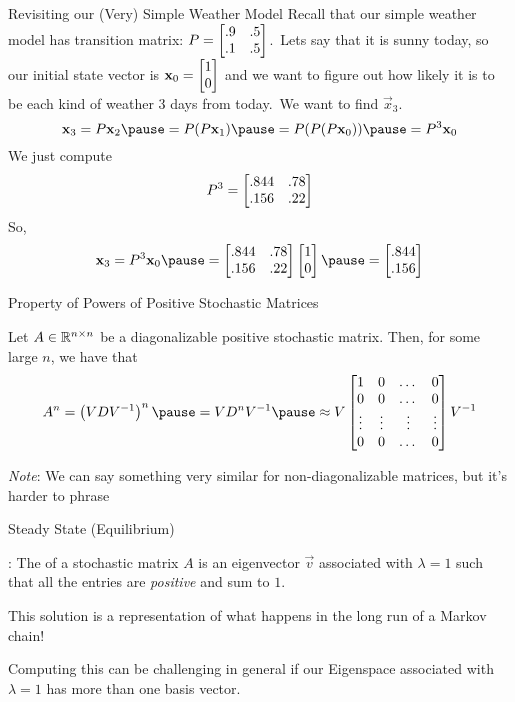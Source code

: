 \documentclass[xcoler=dvipsnames, aspectratio=169]{beamer}
\begin{document}
    \begin{frame}{Revisiting our (Very) Simple Weather Model}
        Recall that our simple weather model has transition matrix: $P=\begin{bmatrix}.9 & .5\\.1 & .5\end{bmatrix}$.\pause\
        Lets say that it is sunny today, so our initial state vector is $\mathbf{x}_0 = \begin{bmatrix}1\\0\end{bmatrix}$
        and we want to figure out how likely it is to be each kind of weather $3$ days from today.\pause\
        We want to find $\vec{x}_3$.\pause
        \[
            \vec{x}_3 = P\vec{x}_2\pause = P(P\vec{x}_1)\pause = P(P(P\vec{x}_0))\pause = P^3\vec{x}_0
        \]\pause
        We just compute 
        \[
            P^3 = \begin{bmatrix}
                .844 & .78\\
                .156 & .22
            \end{bmatrix}
        \]\pause
        So, 
        \[
            \vec{x}_3 = P^3\vec{x}_0\pause = \bMat{
                .844 & .78\\
                .156 & .22
            }\bMat{1\\0}\pause = \bMat{.844\\.156}
        \]
    \end{frame}
    \begin{frame}{Property of Powers of Positive Stochastic Matrices}
        \begin{theorem}
            Let $A\in\mathbb{R}^{n\times n}$ be a diagonalizable positive stochastic matrix. Then, for some
            large $n$, we have that\pause
            \[
                A^n = \left(VDV^{-1}\right)^n\pause = VD^nV^{-1}\pause\approx V\bMat{
                    1 & 0 & \dots & 0\\
                    0 & 0 & \dots & 0\\
                    \vdots & \vdots & \vdots & \vdots\\
                    0 & 0 & \dots & 0\\
                }V^{-1}
            \]
        \end{theorem}\pause
        \emph{Note}: We can say something very similar for non-diagonalizable matrices, but it's
        harder to phrase
    \end{frame}
    \begin{frame}{Steady State (Equilibrium)}
        \begin{defn}
            \rText{Steady State}: The  of a stochastic matrix $A$ is an eigenvector
            $\vec{v}$ associated with $\lambda=1$ such that all the entries are \emph{positive} and 
            sum to $1$.
        \end{defn}\pause
        This solution is a representation of what happens in the long run of a Markov chain!\pause

        Computing this can be challenging in general if our Eigenspace associated with $\lambda=1$
        has more than one basis vector.
    \end{frame}
\end{document}
